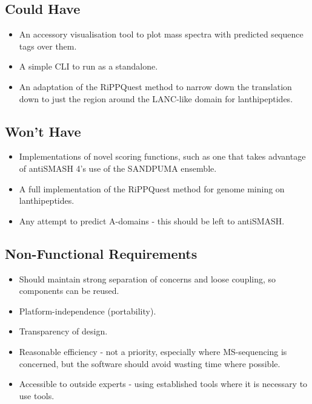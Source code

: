 \documentclass{l4proj}
\begin{document}
\subsection{Could Have}

\begin{itemize}
\item An accessory visualisation tool to plot mass spectra with predicted sequence tags over them.
\item A simple CLI to run as a standalone.
\item An adaptation of the RiPPQuest method to narrow down the translation down to just the region around the LANC-like domain for lanthipeptides.
\end{itemize}

\subsection{Won't Have}

\begin{itemize}
\item Implementations of novel scoring functions, such as one that takes advantage of antiSMASH 4's use of the SANDPUMA ensemble.
\item A full implementation of the RiPPQuest method for genome mining on lanthipeptides.
\item Any attempt to predict A-domains - this should be left to antiSMASH.
\end{itemize}

\subsection{Non-Functional Requirements}

\begin{itemize}
\item Should maintain strong separation of concerns and loose coupling, so components can be reused.
\item Platform-independence (portability).
\item Transparency of design.
\item Reasonable efficiency - not a priority, especially where MS-sequencing is concerned, but the software should avoid wasting time where possible.
\item Accessible to outside experts - using established tools where it is necessary to use tools.
\end{itemize}

\end{document}
